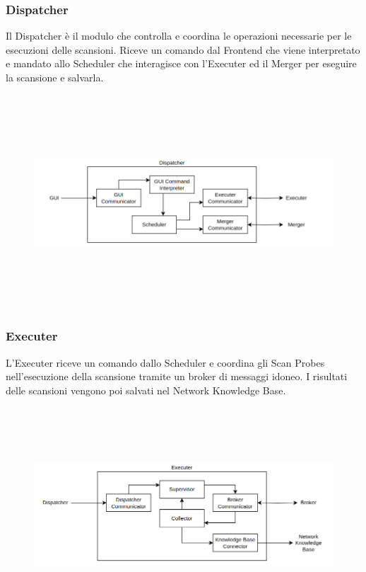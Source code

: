 \documentclass[target=bach,aauheader=,style=]{thud}
\begin{document}
\subsubsection{Dispatcher} 
Il Dispatcher è il modulo che controlla e coordina le operazioni necessarie per le esecuzioni delle scansioni.
Riceve un comando dal Frontend che viene interpretato e mandato allo Scheduler che interagisce con l'Executer ed il Merger per eseguire la scansione e salvarla.

\begin{figure}[h]
  \includegraphics[width=14cm, height=8cm]{dispatcher}
  \centering
\end{figure}

\FloatBarrier

\subsubsection{Executer} 
L'Executer riceve un comando dallo Scheduler e coordina gli Scan Probes nell'esecuzione della scansione tramite un broker di messaggi idoneo. I risultati delle scansioni vengono poi salvati nel Network Knowledge Base.

\begin{figure}[h]
  \includegraphics[width=14cm, height=8cm]{executer}
  \centering
\end{figure}
\end{document}
